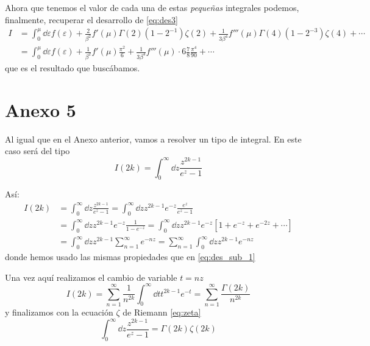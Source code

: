 Ahora que tenemos el valor de cada una de estas \emph{pequeñas} integrales podemos, finalmente, recuperar el desarrollo de \eqref{eq:des3}
\begin{align}\label{eq:des4}
	I &= \int_{0}^{\mu} \dd{\varepsilon} f(\varepsilon) + \frac{2}{\beta^2}f'(\mu) \Gamma(2)(1-2^{-1})\zeta(2) + \frac{1}{3\beta^4}f'''(\mu) \Gamma(4)(1-2^{-3})\zeta(4) + \cdots  \nonumber \\
		&= \int_{0}^{\mu} \dd{\varepsilon} f(\varepsilon) + \frac{1}{\beta^2}f'(\mu) \frac{\pi^2}{6} + \frac{1}{3\beta^4}f'''(\mu) \cdot 6 \frac{7}{8}\frac{\pi^4}{90} + \cdots
\end{align}
que es el resultado que buscábamos.

\newpage
\section*{Anexo 5}\label{Anx5}
\renewcommand{\theequation}{A\textsubscript{5}.\arabic{equation}}
\setcounter{equation}{0}

Al igual que en el Anexo anterior, vamos a resolver un tipo de integral. En este caso será del tipo
\begin{equation}
	I(2k) = \int_{0}^{\infty} \dd{z} \frac{z^{2k-1}}{e^z-1}
\end{equation}

Así:
\begin{align}
	I(2k) &= \int_{0}^{\infty} \dd{z} \frac{z^{2k-1}}{e^z-1} = \int_{0}^{\infty} \dd{z} z^{2k-1} e^{-z}\frac{e^z}{e^z-1} \nonumber \\
		&= \int_{0}^{\infty} \dd{z} z^{2k-1} e^{-z}\frac{1}{1 - e^{-z}} = \int_{0}^{\infty} \dd{z} z^{2k-1} e^{-z} \left[1 + e^{-z} + e^{-2z} + \cdots \right] \\
		&= \int_{0}^{\infty} \dd{z} z^{2k-1} \sum_{n=1}^{\infty} e^{-nz} = \sum_{n=1}^{\infty}  \int_{0}^{\infty} \dd{z} z^{2k-1} e^{-nz}  \nonumber
\end{align}
donde hemos usado las mismas propiedades que en \eqref{eq:des_sub_1}

Una vez aquí realizamos el cambio de variable $t=nz$
\begin{equation}
	I(2k) = \sum_{n=1}^{\infty} \frac{1}{n^{2k}} \int_{0}^{\infty} \dd{t} t^{2k-1} e^{-t} = \sum_{n=1}^{\infty} \frac{\Gamma(2k)}{n^{2k}}
\end{equation}
y finalizamos con la ecuación $\zeta$ de Riemann \eqref{eq:zeta}
\begin{equation}
	\int_{0}^{\infty} \dd{z} \frac{z^{2k-1}}{e^z-1} = \Gamma(2k)\zeta(2k)
\end{equation}



